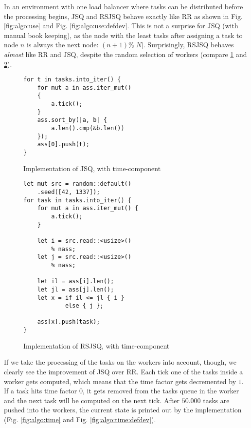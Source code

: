 In an environment with one load balancer where tasks can be distributed before
the processing begins, \ac{JSQ} and \ac{RSJSQ} behave exactly like \ac{RR} as
shown in Fig. \ref{fig:algo:use} and Fig. \ref{fig:algo:use:defdev}.
This is not a surprise for \ac{JSQ} (with manual book keeping), as the node with
the least tasks after assigning a task to node $n$ is always the next node:
$(n + 1) \% |N|$.
Surprisingly, \ac{RSJSQ} behaves \emph{almost} like \ac{RR} and \ac{JSQ},
despite the random selection of workers
(compare \ref{lst:jsq} and \ref{lst:rsjsq}).

\begin{figure}[]
	\begin{verbatim}
for t in tasks.into_iter() {
    for mut a in ass.iter_mut()
    {
        a.tick();
    }
    ass.sort_by(|a, b| {
        a.len().cmp(&b.len())
    });
    ass[0].push(t);
}
	\end{verbatim}
    \caption{Implementation of \ac{JSQ}, with time-component}
    \label{lst:jsq}
\end{figure}

\begin{figure}[b!]
	\begin{verbatim}
let mut src = random::default()
    .seed([42, 1337]);
for task in tasks.into_iter() {
    for mut a in ass.iter_mut() {
        a.tick();
    }

    let i = src.read::<usize>()
        % nass;
    let j = src.read::<usize>()
        % nass;

    let il = ass[i].len();
    let jl = ass[j].len();
    let x = if il <= jl { i }
            else { j };

    ass[x].push(task);
}
	\end{verbatim}
    \caption{Implementation of \ac{RSJSQ}, with time-component}
    \label{lst:rsjsq}
\end{figure}

If we take the processing of the tasks on the workers into account, though, we
clearly see the improvement of \ac{JSQ} over \ac{RR}.
Each tick one of the tasks inside a worker gets computed, which means that
the time factor gets decremented by $1$.
If a task hits time factor $0$, it gets removed from the tasks queue in the
worker and the next task will be computed on the next tick.
After $50.000$ tasks are pushed into the workers, the current state is printed
out by the implementation (Fig. \ref{fig:algo:time} and
Fig. \ref{fig:algo:time:defdev}).

